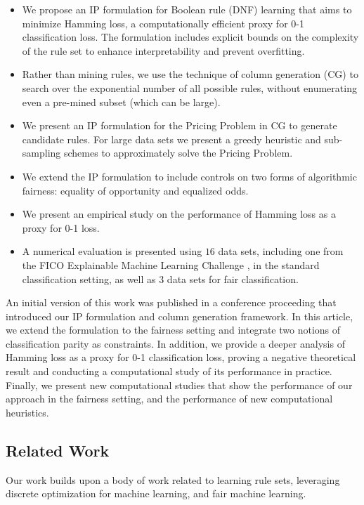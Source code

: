 \documentclass[twoside,11pt]{article}
\begin{document}
\begin{itemize}
    \item We propose an IP formulation for Boolean rule (DNF) learning that aims to minimize Hamming loss, a computationally efficient proxy for 0-1 classification loss. The formulation includes explicit bounds on the complexity of the rule set to enhance interpretability and prevent overfitting.
    \item Rather than mining rules, we use the technique of column generation (CG) to search over the exponential number of all possible rules, without enumerating even a pre-mined subset (which can be large).
    \item We present an IP formulation for the Pricing Problem in CG to generate candidate rules. For large data sets we present a greedy heuristic and sub-sampling schemes to approximately solve the Pricing Problem.
    \item We extend the IP formulation to include controls on two forms of algorithmic fairness: equality of opportunity and equalized odds. 
    \item We present an empirical study on the performance of Hamming loss as a proxy for 0-1 loss.
    \item A numerical evaluation is presented using $16$ data sets, including one from the FICO Explainable Machine Learning Challenge \citep{FICO2018}, in the standard classification setting, as well as $3$ data sets for fair classification.
\end{itemize}


An initial version of this work was published in a conference proceeding \citep{dash2018boolean} that introduced our IP formulation and column generation framework. In this article, we extend the formulation to the fairness setting and integrate two notions of classification parity as constraints. In addition, we provide a deeper analysis of Hamming loss as a proxy for 0-1 classification loss, proving a negative theoretical result and conducting a computational study of its performance in practice. Finally, we present new computational studies that show the performance of our approach in the fairness setting, and the performance of new computational heuristics.



\subsection{Related Work}\label{sec:related}
Our work builds upon a body of work related to learning rule sets, leveraging discrete optimization for machine learning, and fair machine learning.
\end{document}
